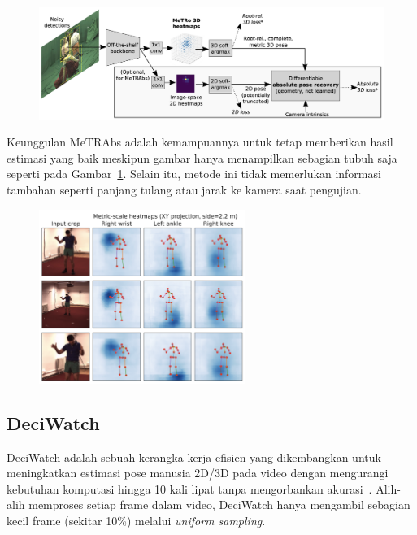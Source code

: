 \begin{figure}[h!]
    \centering
    \includegraphics[width=\textwidth]{images/metrabs_architecture.png}
    \label{fig:metrabs_architecture}
\end{figure}

Keunggulan MeTRAbs adalah kemampuannya untuk tetap memberikan hasil estimasi yang baik meskipun gambar hanya menampilkan sebagian tubuh saja seperti pada Gambar~\ref{fig:metrabs_architecture}. Selain itu, metode ini tidak memerlukan informasi tambahan seperti panjang tulang atau jarak ke kamera saat pengujian.

\begin{figure}[h!]
    \centering
    \includegraphics[width=0.6\textwidth]{images/metrabs_result.png}
    \label{fig:metrabs_result}
\end{figure}

\subsection{DeciWatch}

DeciWatch adalah sebuah kerangka kerja efisien yang dikembangkan untuk meningkatkan estimasi pose manusia 2D/3D pada video dengan mengurangi kebutuhan komputasi hingga 10 kali lipat tanpa mengorbankan akurasi~\cite{zeng2022deciwatch}. Alih-alih memproses setiap frame dalam video, DeciWatch hanya mengambil sebagian kecil frame (sekitar 10\%) melalui \textit{uniform sampling}. 

